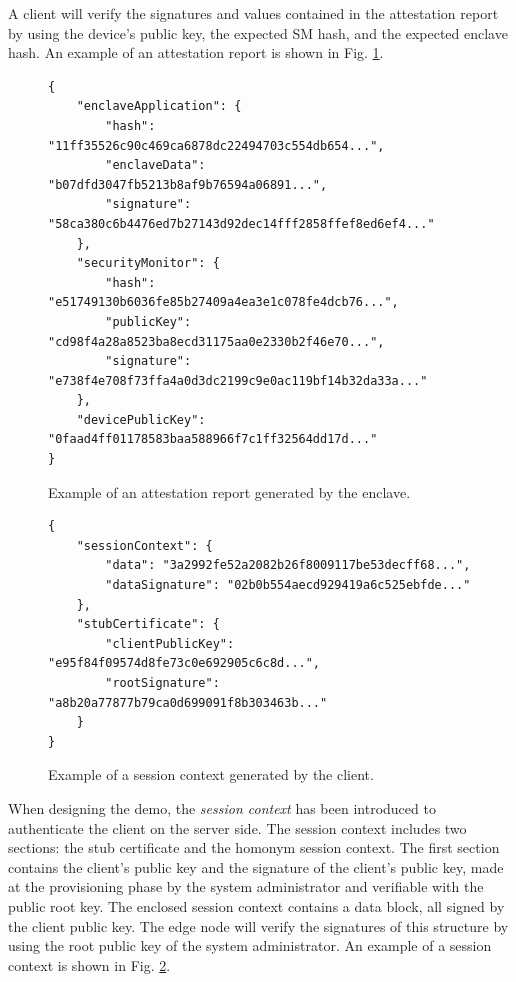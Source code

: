 A client will verify the signatures and values contained in the attestation report by using the device's public key, the expected SM hash, and the expected enclave hash. An example of an attestation report is shown in Fig. \ref{attestation-report}. \\
\begin{figure}[H]
\begin{lstlisting}[style=json, frame=single]
{
    "enclaveApplication": {
        "hash": "11ff35526c90c469ca6878dc22494703c554db654...",
        "enclaveData": "b07dfd3047fb5213b8af9b76594a06891...",
        "signature": "58ca380c6b4476ed7b27143d92dec14fff2858ffef8ed6ef4..."
    },
    "securityMonitor": {
        "hash": "e51749130b6036fe85b27409a4ea3e1c078fe4dcb76...",
        "publicKey": "cd98f4a28a8523ba8ecd31175aa0e2330b2f46e70...",
        "signature": "e738f4e708f73ffa4a0d3dc2199c9e0ac119bf14b32da33a..."
    },
    "devicePublicKey": "0faad4ff01178583baa588966f7c1ff32564dd17d..."
}
\end{lstlisting}
\caption{Example of an attestation report generated by the enclave. \label{attestation-report}}
\end{figure}

\begin{figure}[H]
\begin{lstlisting}[captionpos=b,style=json, frame=single]
{
    "sessionContext": {
        "data": "3a2992fe52a2082b26f8009117be53decff68...",
        "dataSignature": "02b0b554aecd929419a6c525ebfde..."
    },
    "stubCertificate": {
        "clientPublicKey": "e95f84f09574d8fe73c0e692905c6c8d...",
        "rootSignature": "a8b20a77877b79ca0d699091f8b303463b..."
    }
}
\end{lstlisting}
\caption{Example of a session context generated by the client. \label{session-context}}
\end{figure}

When designing the demo, the \textit{session context} has been introduced to authenticate the client on the server side. The session context includes two sections: the stub certificate and the homonym session context. The first section contains the client's public key and the signature of the client's public key, made at the provisioning phase by the system administrator and verifiable with the public root key. The enclosed session context contains a data block, all signed by the client public key. 
The edge node will verify the signatures of this structure by using the root public key of the system administrator. An example of a session context is shown in Fig. \ref{session-context}. \\

